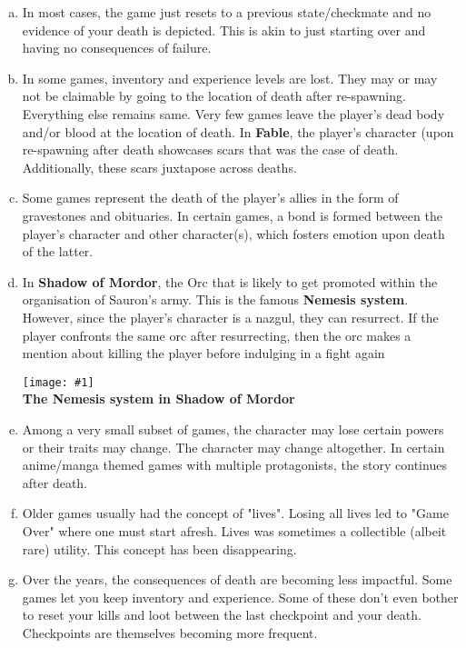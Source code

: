 \documentclass[12pt]{article}
\newcommand{\fig}[3]{\begin{center} \texttt{[image: \#1]}\\ \textbf{#3} \end{center}}
\begin{document}
\begin{enumerate}[a)]

\item In most cases, the game just resets to a previous state/checkmate and no evidence of your death is depicted. This is akin to just starting over and having no consequences of failure.

\item In some games, inventory and experience levels are lost. They may or may not be claimable by going to the location of death after re-spawning. Everything else remains same. Very few games leave the player's dead body and/or blood at the location of death. In \textbf{Fable}, the player's character (upon re-spawning after death showcases scars that was the case of death. Additionally, these scars juxtapose across deaths.

\item Some games represent the death of the player's allies in the form of gravestones and obituaries. In certain games, a bond is formed between the player's character and other character(s), which fosters emotion upon death of the latter.

\item In \textbf{Shadow of Mordor}, the Orc that is likely to get promoted within the organisation of Sauron's army. This is the famous \textbf{Nemesis system}. However, since the player's character is a nazgul, they can resurrect. If the player confronts the same orc after resurrecting, then the orc makes a mention about killing the player before indulging in a fight again

\fig{shadow_of_mordor_nemesis.jpg}{0.3}{The Nemesis system in Shadow of Mordor}

\item Among a very small subset of games, the character may lose certain powers or their traits may change. The character may change altogether. In certain anime/manga themed games with multiple protagonists, the story continues after death.

\item Older games usually had the concept of "lives". Losing all lives led to "Game Over" where one must start afresh. Lives was sometimes a collectible (albeit rare) utility. This concept has been disappearing.

\item Over the years, the consequences of death are becoming less impactful. Some games let you keep inventory and experience. Some of these don't even bother to reset your kills and loot between the last checkpoint and your death. Checkpoints are themselves becoming more frequent.

\end{enumerate}
\end{document}
